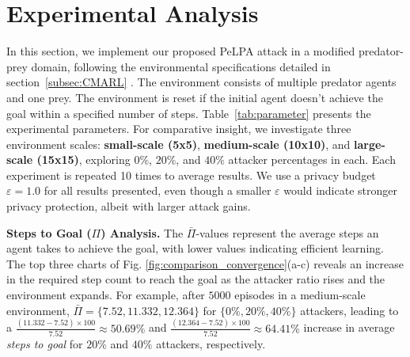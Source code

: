 \section{Experimental Analysis} \label{s:experimentalAnalysis}
In this section, we implement our proposed PeLPA attack in a modified predator-prey domain, following the environmental specifications detailed in section~\ref{subsec:CMARL} \cite{le2017coordinated}. The environment consists of multiple predator agents and one prey. The environment is reset if the initial agent doesn't achieve the goal within a specified number of steps. Table~\ref{tab:parameter} presents the experimental parameters. For comparative insight, we investigate three environment scales: \textbf{small-scale (5x5)}, \textbf{medium-scale (10x10)}, and \textbf{large-scale (15x15)}, exploring $0\%$, $20\%$, and $40\%$ attacker percentages in each. Each experiment is repeated 10 times to average results. We use a privacy budget $\varepsilon = 1.0$ for all results presented, even though a smaller $\varepsilon$ would indicate stronger privacy protection, albeit with larger attack gains.

\textbf{Steps to Goal ($\Pi$) Analysis.} 
The $\bar{\Pi}$-values represent the average steps an agent takes to achieve the goal, with lower values indicating efficient learning. The top three charts of Fig. \ref{fig:comparison_convergence}(a-c) reveals an increase in the required step count to reach the goal as the attacker ratio rises and the environment expands. For example, after $5000$ episodes in a medium-scale environment, $\bar{\Pi} = \{7.52, 11.332, 12.364\}$ for $\{0\%, 20\%, 40\%\}$ attackers, leading to a $\frac{(11.332-7.52)\times 100}{7.52}\approx 50.69\%$ and $\frac{(12.364-7.52)\times 100}{7.52}\approx 64.41\%$ increase in average \textit{steps to goal} for $20\%$ and $40\%$ attackers, respectively.


